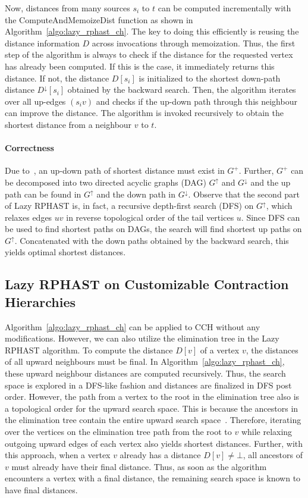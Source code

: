 \documentclass[manuscript,review]{acmart}
\newcommand*{\gchu}{G^{\uparrow}}
\newcommand*{\gchd}{G^{\downarrow}}
\begin{document}
Now, distances from many sources $s_i$ to $t$ can be computed incrementally with the \textsf{ComputeAndMemoizeDist} function as shown in Algorithm~\ref{algo:lazy_rphast_ch}.
The key to doing this efficiently is reusing the distance information $D$ across invocations through memoization.
Thus, the first step of the algorithm is always to check if the distance for the requested vertex has already been computed.
If this is the case, it immediately returns this distance.
If not, the distance $D[s_i]$ is initialized to the shortest down-path distance $D^{\downarrow}[s_i]$ obtained by the backward search.
Then, the algorithm iterates over all up-edges $(s_i v)$ and checks if the up-down path through this neighbour can improve the distance.
The algorithm is invoked recursively to obtain the shortest distance from a neighbour $v$ to $t$.

\paragraph{Correctness}
Due to~\cite{gssv-erlrn-12}, an up-down path of shortest distance must exist in $G^+$.
Further, $G^+$ can be decomposed into two directed acyclic graphs (DAG) $\gchu$ and $\gchd$ and the up path can be found in $\gchu$ and the down path in $\gchd$.
Observe that the second part of Lazy RPHAST is, in fact, a recursive depth-first search (DFS) on $\gchu$, which relaxes edges $uv$ in reverse topological order of the tail vertices $u$.
Since DFS can be used to find shortest paths on DAGs, the search will find shortest up paths on $\gchu$.
Concatenated with the down paths obtained by the backward search, this yields optimal shortest distances.

\subsection{Lazy RPHAST on Customizable Contraction Hierarchies}

Algorithm~\ref{algo:lazy_rphast_ch} can be applied to CCH without any modifications.
However, we can also utilize the elimination tree in the Lazy RPHAST algorithm.
To compute the distance $D[v]$ of a vertex $v$, the distances of all upward neighbours must be final.
In Algorithm~\ref{algo:lazy_rphast_ch}, these upward neighbour distances are computed recursively.
Thus, the search space is explored in a DFS-like fashion and distances are finalized in DFS post order.
However, the path from a vertex to the root in the elimination tree also is a topological order for the upward search space.
This is because the ancestors in the elimination tree contain the entire upward search space~\cite{bcrw-s-16}.
Therefore, iterating over the vertices on the elimination tree path from the root to $v$ while relaxing outgoing upward edges of each vertex also yields shortest distances.
Further, with this approach, when a vertex $v$ already has a distance $D[v] \neq \bot$, all ancestors of $v$ must already have their final distance.
Thus, as soon as the algorithm encounters a vertex with a final distance, the remaining search space is known to have final distances.
\end{document}
